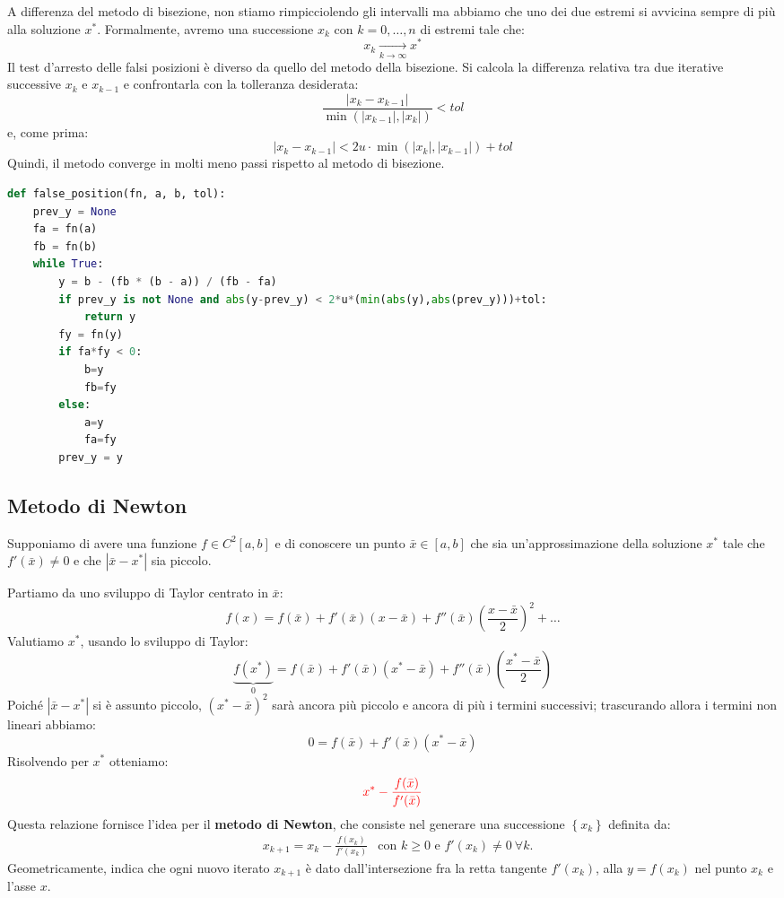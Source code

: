 \documentclass{article}
\begin{document}
A differenza del metodo di bisezione, non stiamo rimpicciolendo gli intervalli
ma abbiamo che uno dei due estremi si avvicina sempre di più alla soluzione
$x^*$. Formalmente, avremo una successione $x_k$ con $k=0,\ldots,n$ di estremi
tale che:
$$x_k\underset{k\to\infty}{\to} x^*$$
Il test d'arresto delle falsi posizioni è diverso da quello del metodo della
bisezione. Si calcola la differenza relativa tra due iterative successive $x_k$ e
$x_{k-1}$ e confrontarla con la tolleranza desiderata:
$$\frac{\left\lvert x_k-x_{k-1}\right\rvert}{\min(\left\lvert
x_{k-1}\right\rvert, \left\lvert x_k\right\rvert)} < tol$$
e, come prima: 
$$\left\lvert x_k-x_{k-1}\right\rvert<2u\cdot\min(\left\lvert x_k\right\rvert,
\left\lvert x_{k-1}\right\rvert)+tol$$
Quindi, il metodo converge in molti meno passi rispetto al metodo di
bisezione.
\newpage
\begin{lstlisting}[language=Python]
def false_position(fn, a, b, tol):
    prev_y = None
    fa = fn(a)
    fb = fn(b)
    while True:
        y = b - (fb * (b - a)) / (fb - fa)
        if prev_y is not None and abs(y-prev_y) < 2*u*(min(abs(y),abs(prev_y)))+tol:
            return y
        fy = fn(y)
        if fa*fy < 0:
            b=y
            fb=fy
        else:
            a=y
            fa=fy
        prev_y = y
\end{lstlisting}
\subsection{Metodo di Newton}
Supponiamo di avere una funzione $f\in C^2[a,b]$ e di conoscere un punto $\bar{x}\in[a,b]$ che
sia un'approssimazione della soluzione $x^*$ tale che $f'(\bar{x})\neq 0$ e
che $\left\lvert \bar{x}-x^*\right\rvert$ sia piccolo.

Partiamo da uno sviluppo di Taylor centrato in $\bar{x}$:
$$f(x)=f(\bar{x})+f'(\bar{x})(x-\bar{x})+f''(\bar{x})\left(\frac{x-\bar{x}}{2}\right)^2+\ldots$$
Valutiamo $x^*$, usando lo sviluppo di Taylor:
$$\underbrace{f(x^*)}_{0}=f(\bar{x})+f'(\bar{x})(x^*-\bar{x})+f''(\bar{x})\left(\frac{x^*-\bar{x}}{2}\right)$$
Poiché $\left\lvert \bar{x} - x^*\right\rvert$ si è assunto piccolo,
$(x^*-\bar{x})^2$ sarà ancora più piccolo e ancora di più i termini
successivi; trascurando allora i termini non lineari abbiamo:
$$0=f(\bar{x})+f'(\bar{x})(x^*-\bar{x})$$
Risolvendo per $x^*$ otteniamo: 
$${\color{red}x^*-\frac{f(\bar{x})}{f'(\bar{x})}}$$
Questa relazione fornisce l'idea per il \textbf{metodo di Newton}, che
consiste nel generare una successione $\left\{x_k\right\}$ definita da:
\begin{equation}
    \begin{aligned}
        & x_{k+1}=x_k-\frac{f(x_k)}{f'(x_k)} &\text{con } k\geq0\text{ e
        }f'(x_k)\neq0\ \forall k.
    \end{aligned}
\end{equation}
Geometricamente, indica che ogni nuovo iterato $x_{k+1}$ è dato
dall'intersezione fra la retta tangente $f'(x_k)$,  alla $y=f(x_k)$ nel punto $x_k$ 
e l'asse $x$.
\end{document}
